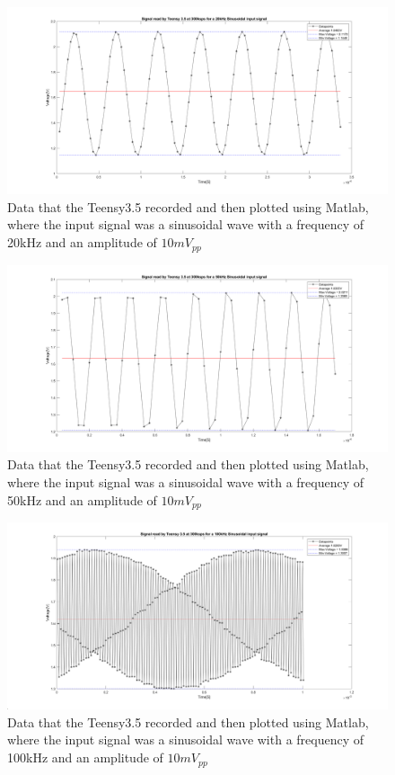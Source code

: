 \begin{figure}[h]
    \centering
    \includegraphics[width=1.0\textwidth]{graphics/20khzMatlab.png}
    \caption{Data that the Teensy3.5 recorded and then plotted using Matlab, where the input signal was a sinusoidal wave with a frequency of 20kHz and an amplitude of $10mV_{pp}$}
    \label{fig:20kmatlab}
\end{figure}

\begin{figure}[h]
    \centering
    \includegraphics[width=1.0\textwidth]{graphics/50khzMatlab.png}
    \caption{Data that the Teensy3.5 recorded and then plotted using Matlab, where the input signal was a sinusoidal wave with a frequency of 50kHz and an amplitude of $10mV_{pp}$}
    \label{fig:50kmatlab}
\end{figure}

\begin{figure}[h]
    \centering
    \includegraphics[width=1.0\textwidth]{graphics/100khzMatlab.png}
    \caption{Data that the Teensy3.5 recorded and then plotted using Matlab, where the input signal was a sinusoidal wave with a frequency of 100kHz and an amplitude of $10mV_{pp}$}
    \label{fig:100kmatlab}
\end{figure}





